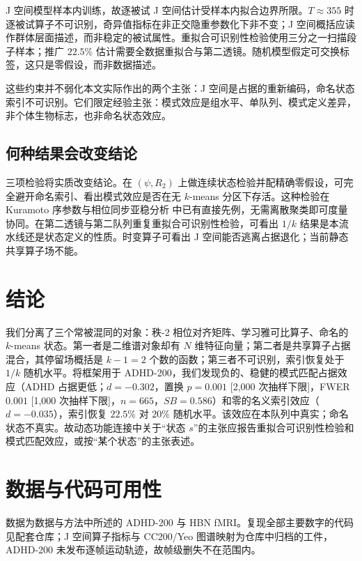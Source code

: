 \documentclass[11pt]{ctexart}
\theoremstyle{definition}
\begin{document}
J 空间模型样本内训练，故逐被试 J 空间估计受样本内拟合边界所限。$T\approx355$ 时逐被试算子不可识别，奇异值指标在非正交隐重参数化下非不变；J 空间概括应读作群体层面描述，而非稳定的被试属性。重拟合可识别性检验使用三分之一扫描段子样本；推广 $22.5\%$ 估计需要全数据重拟合与第二透镜。随机模型假定可交换标签，这只是零假设，而非数据描述。

这些约束并不弱化本文实际作出的两个主张：J 空间是占据的重新编码，命名状态索引不可识别。它们限定经验主张：模式效应是组水平、单队列、模式定义差异，非个体生物标志，也非命名状态效应。

\subsection*{何种结果会改变结论}

三项检验将实质改变结论。在 $(\psi,R_2)$ 上做连续状态检验并配精确零假设，可完全避开命名索引、看出模式效应是否在无 $k$-means 分区下存活。这种检验在 Kuramoto 序参数与相位同步亚稳分析\cite{Hancock2023} 中已有直接先例，无需离散聚类即可度量协同。在第二透镜与第二队列重复重拟合可识别性检验，可看出 $1/k$ 结果是本流水线还是状态定义的性质。时变算子可看出 J 空间能否逃离占据退化；当前静态共享算子场不能。

\section{结论}
\label{sec:conclusion}

我们分离了三个常被混同的对象：秩-2 相位对齐矩阵、学习雅可比算子、命名的 $k$-means 状态。第一者是二维谱对象却有 $N$ 维特征向量；第二者是共享算子占据混合，其停留场概括是 $k-1=2$ 个数的函数；第三者不可识别，索引恢复处于 $1/k$ 随机水平。将框架用于 ADHD-200，我们发现负的、稳健的模式匹配占据效应（ADHD 占据更低；$d=-0.302$，置换 $p=0.001$ [2,000 次抽样下限]，FWER $0.001$ [1,000 次抽样下限]，$n=665$，$SB=0.586$）和零的名义索引效应（$d=-0.035$），索引恢复 $22.5\%$ 对 $20\%$ 随机水平。该效应在本队列中真实；命名状态不真实。故动态功能连接中关于“状态 $s$”的主张应报告重拟合可识别性检验和模式匹配效应，或按“某个状态”的主张表述。

\section*{数据与代码可用性}
数据为数据与方法中所述的 ADHD-200 与 HBN fMRI。复现全部主要数字的代码见配套仓库；J 空间算子指标与 CC200/Yeo 图谱映射为仓库中归档的工件，ADHD-200 未发布逐帧运动轨迹，故帧级删失不在范围内。
\end{document}

